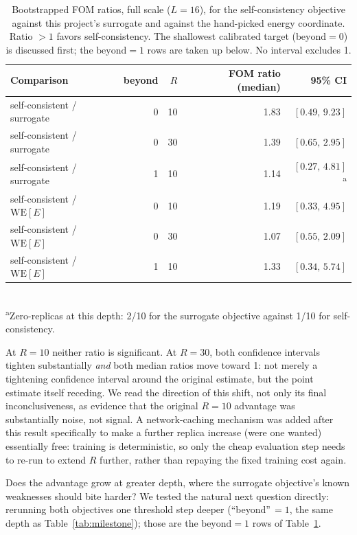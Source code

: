 \documentclass[a4paper,fleqn]{cas-sc}
\begin{document}
	\begin{table}[H]
		\centering\small
		\caption{Bootstrapped FOM ratios, full scale ($L=16$), for the self-consistency objective
			against this project's surrogate and against the hand-picked energy coordinate. Ratio
			$>1$ favors self-consistency. The shallowest calibrated target
			($\mathrm{beyond}=0$) is discussed first; the $\mathrm{beyond}=1$ rows are taken up
			below. No interval excludes 1.}
		\label{tab:kimcaiboot}
		\begin{tabular}{lrrrr}
			\toprule
			Comparison & beyond & $R$ & FOM ratio (median) & 95\% CI \\
			\midrule
			self-consistent / surrogate & 0 & 10 & 1.83 & $[0.49,\,9.23]$ \\
			self-consistent / surrogate & 0 & 30 & 1.39 & $[0.65,\,2.95]$ \\
			self-consistent / surrogate & 1 & 10 & 1.14 & $[0.27,\,4.81]$\textsuperscript{a} \\
			self-consistent / $\mathrm{WE}[E]$ & 0 & 10 & 1.19 & $[0.33,\,4.95]$ \\
			self-consistent / $\mathrm{WE}[E]$ & 0 & 30 & 1.07 & $[0.55,\,2.09]$ \\
			self-consistent / $\mathrm{WE}[E]$ & 1 & 10 & 1.33 & $[0.34,\,5.74]$ \\
			\bottomrule
		\end{tabular}
		\\[2pt]
		{\footnotesize\textsuperscript{a}Zero-replicas at this depth: 2/10 for the surrogate
			objective against 1/10 for self-consistency.}
	\end{table}
	
	At $R=10$ neither ratio is significant. At $R=30$, both confidence intervals tighten
	substantially \emph{and} both median ratios move toward 1: not merely a tightening
	confidence interval around the original estimate, but the point estimate itself receding.
	We read the direction of this shift, not only its final inconclusiveness, as evidence that
	the original $R=10$ advantage was substantially noise, not signal. A network-caching
	mechanism was added after this result specifically to make a further replica increase (were
	one wanted) essentially free: training is deterministic, so only the cheap evaluation step
	needs to re-run to extend $R$ further, rather than repaying the fixed training cost again.
	
	Does the advantage grow at greater depth, where the surrogate objective's known
	weaknesses should bite harder? We tested the natural next question directly: rerunning
	both objectives one threshold step deeper (``beyond''\,$=1$, the same depth as
	Table~\ref{tab:milestone}); those are the $\mathrm{beyond}=1$ rows of
	Table~\ref{tab:kimcaiboot}.
	
\end{document}
